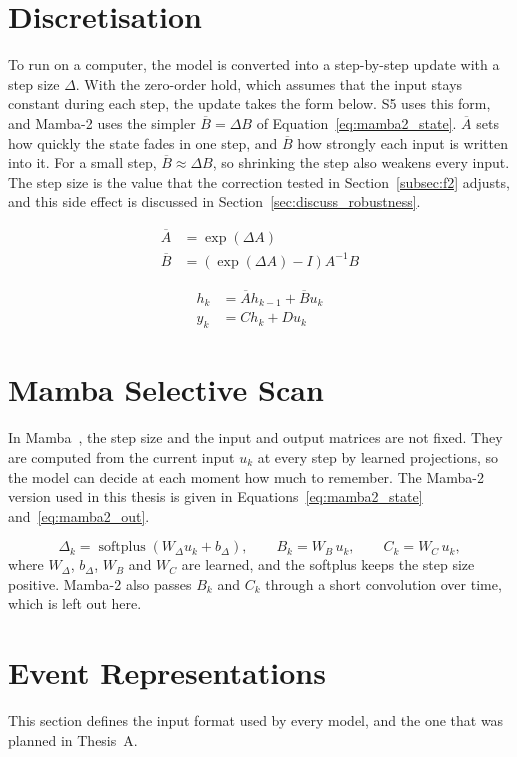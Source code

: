 \documentclass[11pt, a4paper]{report}
\begin{document}
\section{Discretisation}
To run on a computer, the model is converted into a step-by-step update with a step size $\Delta$. With
the zero-order hold, which assumes that the input stays constant during each step, the update takes the form below. S5 uses this form, and Mamba-2 uses the simpler $\overline{B}=\Delta B$ of
Equation~\eqref{eq:mamba2_state}. $\overline{A}$ sets how quickly the state fades in one step, and
$\overline{B}$ how strongly each input is written into it. For a small step, $\overline{B}\approx\Delta B$,
so shrinking the step also weakens every input. The step size
is the value that the correction tested in Section~\ref{subsec:f2} adjusts, and this side effect is
discussed in Section~\ref{sec:discuss_robustness}.

\begin{align}
    \overline{A} &= \exp(\Delta A) \\
    \overline{B} &= (\exp(\Delta A) - I) A^{-1} B
\end{align}

\begin{align}
    h_k &= \overline{A} h_{k-1} + \overline{B} u_k \\
    y_k &= C h_k + D u_k
\end{align}

\section{Mamba Selective Scan}
In Mamba~\cite{gu2023mamba}, the step size and the input and output matrices are not fixed. They are
computed from the current input $u_k$ at every step by learned projections, so the model can decide at each
moment how much to remember. The Mamba-2 version used in this thesis is given in
Equations~\eqref{eq:mamba2_state} and~\eqref{eq:mamba2_out}.

\begin{equation}
    \Delta_k = \operatorname{softplus}\!\left(W_\Delta u_k + b_\Delta\right), \qquad
    B_k = W_B\, u_k, \qquad C_k = W_C\, u_k,
\end{equation}
where $W_\Delta$, $b_\Delta$, $W_B$ and $W_C$ are learned, and the softplus keeps the step size positive.
Mamba-2 also passes $B_k$ and $C_k$ through a short convolution over time, which is left out here.

\section{Event Representations}
This section defines the input format used by every model, and the one that was planned in Thesis~A.
\end{document}
